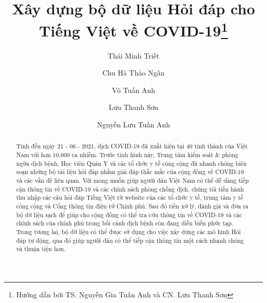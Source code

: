 \documentclass[runningheads]{llncs}
\begin{document}
%
\title{Xây dựng bộ dữ liệu Hỏi đáp cho Tiếng Việt về COVID-19\thanks{Hướng dẫn bởi TS. Nguyễn Gia Tuấn Anh và CN. Lưu Thanh Sơn}}
%
%
\author{Thái Minh Triết \and
Chu Hà Thảo Ngân \and
Võ Tuấn Anh \and
Lưu Thanh Sơn \and
Nguyễn Lưu Tuấn Anh 
}
%
%

%
\maketitle              %
%
\begin{abstract}
Tính đến ngày 21 - 06 - 2021, dịch COVID-19 đã xuất hiện tại 40 tỉnh thành của Việt Nam với hơn 10.000 ca nhiễm. Trước tình hình này, Trung tâm kiểm soát \& phòng ngừa dịch bệnh, Học viên Quân Y và các tổ chức y tế công cộng đã nhanh chóng biên soạn những bộ tài liệu hỏi đáp nhằm giải đáp thắc mắc của cộng đồng về COVID-19 và các vấn đề liên quan.
Với mong muốn giúp người dân Việt Nam có thể dễ dàng tiếp cận thông tin về COVID-19 và các chính sách phòng chống dịch, chúng tôi tiến hành thu nhập các câu hỏi đáp Tiếng Việt từ website của các tổ chức y tế, trung tâm y tế công cộng và Cổng thông tin điện tử Chính phủ. Sau đó tiền xử lý, đánh giá và đưa ra bộ dữ liệu sạch để giúp cho cộng đồng có thể tra cứu thông tin về COVID-19 và các chính sách của chính phủ trong bối cảnh dịch bệnh còn đang diễn biến phức tạp. Trong tương lai, bộ dữ liệu có thể được sử dụng cho việc xây dựng các mô hình Hỏi đáp tự động, qua đó giúp người dân có thể tiếp cận thông tin một cách nhanh chóng và thuận tiện hơn.


\end{abstract}
%
%
%
\end{document}
